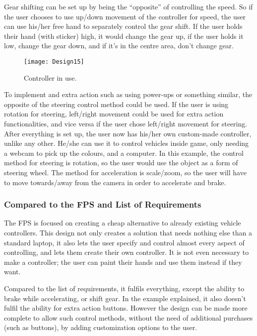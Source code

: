 Gear shifting can be set up by being the “opposite” of controlling the speed. So if the user chooses to use up/down movement of the controller for speed, the user can use his/her free hand to separately control the gear shift. If the user holds their hand (with sticker) high, it would change the gear up, if the user holds it low, change the gear down, and if it’s in the centre area, don’t change gear.

\begin{figure}[h]
\centering
\texttt{[image: Design15]}
\caption{Controller in use.}
\label{fig:design15}
\end{figure}

To implement and extra action such as using power-ups or something similar, the opposite of the steering control method could be used. If the user is using rotation for steering, left/right movement could be used for extra action functionalities, and vice versa if the user chose left/right movement for steering.
After everything is set up, the user now has his/her own custom-made controller, unlike any other. He/she can use it to control vehicles inside game, only needing a webcam to pick up the colours, and a computer. In this example, the control method for steering is rotation, so the user would use the object as a form of steering wheel. The method for acceleration is scale/zoom, so the user will have to move towards/away from the camera in order to accelerate and brake.

\subsubsection*{Compared to the FPS and List of Requirements}
The FPS is focused on creating a cheap alternative to already existing vehicle controllers. This design not only creates a solution that needs nothing else than a standard laptop, it also lets the user specify and control almost every aspect of controlling, and lets them create their own controller. It is not even necessary to make a controller; the user can paint their hands and use them instead if they want.

Compared to the list of requirements, it fulfils everything, except the ability to brake while accelerating, or shift gear. In the example explained, it also doesn’t fulfil the ability for extra action buttons. However the design can be made more complete to allow such control methods, without the need of additional purchases (such as buttons), by adding customization options to the user.

